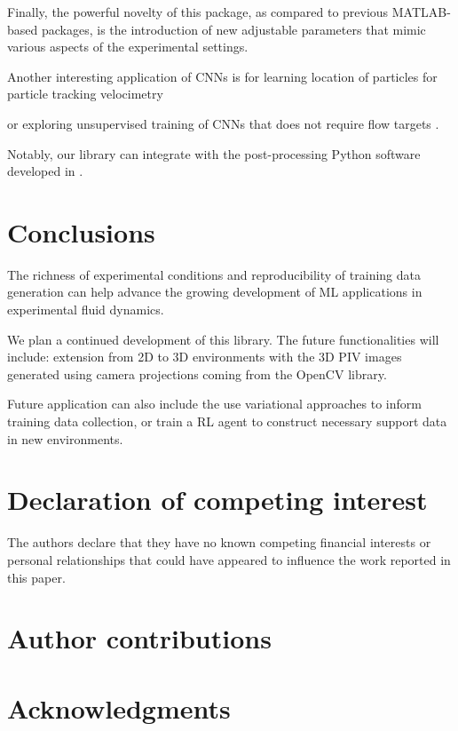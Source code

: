 \documentclass[a4paper,fleqn]{cas-dc}
\newcommand{ \kamila}[1]{\color{blue}{Kamila: #1} \color{black}}
\begin{document}
Finally, the powerful novelty of this package, as compared to previous MATLAB-based packages, is the introduction of new adjustable parameters that mimic various aspects of the experimental settings. 


Another interesting application of CNNs is for learning location of particles for particle tracking velocimetry \cite{godbersen2024peak} 

or exploring unsupervised training of CNNs that does not require flow targets \cite{lagemann2024challenges}. 


Notably, our library can integrate with the post-processing Python software developed in \cite{aguilar2022dpivsoft}.



\section{Conclusions}


The richness of experimental conditions and reproducibility of training data generation can help advance the growing development of ML applications in experimental fluid dynamics.

We plan a continued development of this library. The future functionalities will include: extension from 2D to 3D environments with the 3D PIV images generated using camera projections coming from the OpenCV library.

Future application can also include the use variational approaches to inform training data collection, or train a RL agent to construct necessary support data in new environments.

\section*{Declaration of competing interest}

The authors declare that they have no known competing financial interests or personal relationships that could have appeared to influence the work reported in this paper.

\section*{Author contributions}



\section*{Acknowledgments}





\end{document}
